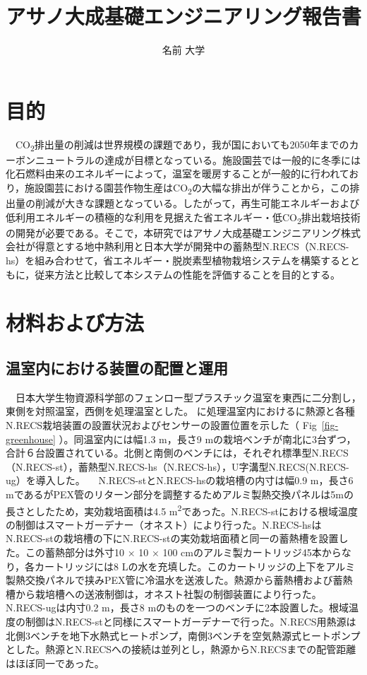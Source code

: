 \documentclass[
  japanese,
  11pt,
  letterpaper,
  DIV=11,
  numbers=noendperiod]{scrartcl}
\title{アサノ大成基礎エンジニアリング報告書}
\author{名前 大学}
\date{}
\begin{document}
\maketitle


\newpage

\section{目的}\label{ux76eeux7684}

　CO\textsubscript{2}排出量の削減は世界規模の課題であり，我が国においても2050年までのカーボンニュートラルの達成が目標となっている。施設園芸では一般的に冬季には化石燃料由来のエネルギーによって，温室を暖房することが一般的に行われており，施設園芸における園芸作物生産はCO\textsubscript{2}の大幅な排出が伴うことから，この排出量の削減が大きな課題となっている。したがって，再生可能エネルギーおよび低利用エネルギーの積極的な利用を見据えた省エネルギー・低CO\textsubscript{2}排出栽培技術の開発が必要である。そこで，本研究ではアサノ大成基礎エンジニアリング株式会社が得意とする地中熱利用と日本大学が開発中の蓄熱型N.RECS（N.RECS-hs）を組み合わせて，省エネルギー・脱炭素型植物栽培システムを構築するとともに，従来方法と比較して本システムの性能を評価することを目的とする。

\section{材料および方法}\label{ux6750ux6599ux304aux3088ux3073ux65b9ux6cd5}

\subsection{温室内における装置の配置と運用}\label{ux6e29ux5ba4ux5185ux306bux304aux3051ux308bux88c5ux7f6eux306eux914dux7f6eux3068ux904bux7528}

　日本大学生物資源科学部のフェンロー型プラスチック温室を東西に二分割し，東側を対照温室，西側を処理温室とした。
に処理温室内におけるに熱源と各種N.RECS栽培装置の設置状況およびセンサーの設置位置を示した（
Fig~\ref{fig-greenhouse} ）。同温室内には幅1.3 m，長さ9
mの栽培ベンチが南北に3台ずつ，合計６台設置されている。北側と南側のベンチには，それぞれ標準型N.RECS（N.RECS-st），蓄熱型N.RECS-hs（N.RECS-hs），U字溝型N.RECS(N.RECS-ug）を導入した。
　N.RECS-stとN.RECS-hsの栽培槽の内寸は幅0.9 m，長さ6
mであるがPEX管のリターン部分を調整するためアルミ製熱交換パネルは5mの長さとしたため，実効栽培面積は4.5
m\textsuperscript{2}であった。N.RECS-stにおける根域温度の制御はスマートガーデナー（オネスト）により行った。N.RECS-hsはN.RECS-stの栽培槽の下にN.RECS-stの実効栽培面積と同一の蓄熱槽を設置した。この蓄熱部分は外寸10
× 10 × 100 cmのアルミ製カートリッジ45本からなり，各カートリッジには8
Lの水を充填した。このカートリッジの上下をアルミ製熱交換パネルで挟みPEX管に冷温水を送液した。熱源から蓄熱槽および蓄熱槽から栽培槽への送液制御は，オネスト社製の制御装置により行った。N.RECS-ugは内寸0.2
m，長さ8
mのものを一つのベンチに2本設置した。根域温度の制御はN.RECS-stと同様にスマートガーデナーで行った。N.RECS用熱源は北側3ベンチを地下水熱式ヒートポンプ，南側3ベンチを空気熱源式ヒートポンプとした。熱源とN.RECSへの接続は並列とし，熱源からN.RECSまでの配管距離はほぼ同一であった。
\end{document}
